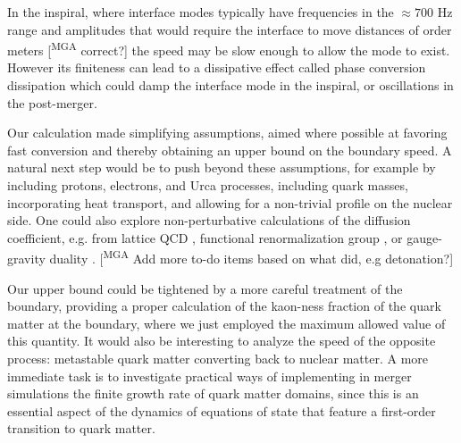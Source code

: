 \documentclass[10pt,superscriptaddress,
amsmath,aps,prl,twocolumn,nofootinbib]{revtex4-1}
\newcommand{\mga}[1]{{\color[rgb]{0.8,0,0}#1}}
\newcommand{\mgacom}[1]{\textsf{\color[rgb]{0.6,0,0}[\textsuperscript{MGA} #1]}}
\newcommand{\AH}[1]{{\color{cyan}#1}}
\newcommand{\JS}[1]{{\color{violet}#1}}
\begin{document}
\mga{In the inspiral, where interface modes typically have frequencies in the $\approx700$ Hz range and
amplitudes that would require the interface to move distances of order meters \mgacom{correct?} the speed may be slow enough to allow the mode to exist. However}
\AH{its finiteness can lead to a dissipative effect called phase conversion dissipation \cite{Alford:2014jha} which could damp the interface mode in the inspiral, or oscillations in the post-merger.} 

Our calculation made simplifying assumptions, aimed where possible at favoring fast conversion and thereby obtaining an upper bound on the boundary speed. A natural next step would be to push beyond these assumptions, for example by including protons, electrons, and Urca processes, including quark masses, \mga{incorporating heat transport, and allowing for} \AH{a non-trivial profile on the nuclear side.}
\mga{One could also explore} non-perturbative calculations of the diffusion coefficient, e.g. from lattice QCD \cite{Meyer:2007ic,Francis:2015daa}, functional renormalization group \cite{Tripolt:2013jra}, or gauge-gravity duality \cite{Policastro:2001yc,Herzog:2006gh}.
\mgacom{Add more to-do items based on what \cite{Furusawa:2015vfn} did, e.g detonation?}


Our upper bound could be tightened by a more careful treatment of the boundary, providing a proper calculation of the kaon-ness fraction of the quark matter at the boundary, where we just employed the maximum allowed value of this quantity. 
It would also be interesting to analyze the speed of the opposite process: metastable quark matter converting back to nuclear matter. A more immediate task is to investigate practical ways of implementing in merger simulations the finite growth rate of quark matter domains, since this is an essential aspect of the dynamics of equations of state that feature a first-order transition to quark matter.
\end{document}
